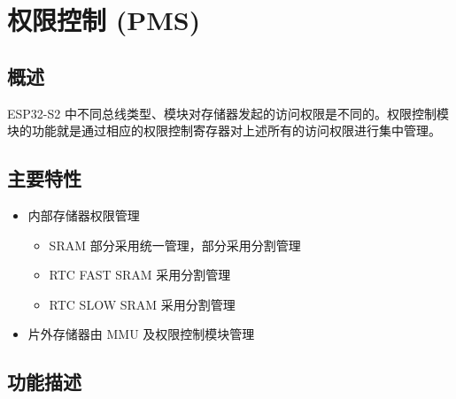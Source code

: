 \documentclass[main\_\_CN.tex]{subfiles}
\begin{document}
\setchineseformatting

\ifglobal
\else
    \listoftodos
    {\let\clearpage\relax \listofdonetodos}
    \tableofcontents
\fi




\hypertarget{permctrl}{}
\chapter{权限控制 (PMS)}
\label{mod:permctrl}


\section{概述}
ESP32-S2 中不同总线类型、模块对存储器发起的访问权限是不同的。权限控制模块的功能就是通过相应的权限控制寄存器对上述所有的访问权限进行集中管理。

\section{主要特性}

\begin{itemize}
    \item 内部存储器权限管理
    \begin{itemize}
        \item SRAM 部分采用统一管理，部分采用分割管理
        \item RTC FAST SRAM 采用分割管理
        \item RTC SLOW SRAM 采用分割管理
    \end{itemize}
    \item 片外存储器由 MMU 及权限控制模块管理
\end{itemize}

\section{功能描述}
\end{document}

